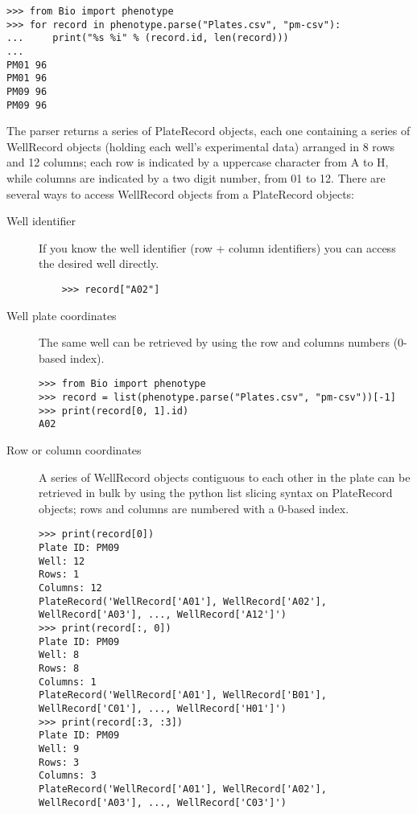 \begin{verbatim}
>>> from Bio import phenotype
>>> for record in phenotype.parse("Plates.csv", "pm-csv"):
...     print("%s %i" % (record.id, len(record)))
...
PM01 96
PM01 96
PM09 96
PM09 96
\end{verbatim}

The parser returns a series of PlateRecord objects, each one containing a series of WellRecord objects
(holding each well's experimental data) arranged in 8 rows and 12 columns; each row is indicated by
a uppercase character from A to H, while columns are indicated by a two digit number, from 01 to 12.
There are several ways to access WellRecord objects from a PlateRecord objects:

\begin{description}
  \item[Well identifier]
    If you know the well identifier (row + column identifiers) you can access the desired well directly.
\begin{verbatim}
    >>> record["A02"]
    \end{verbatim}

  \item[Well plate coordinates]
    The same well can be retrieved by using the row and columns numbers (0-based index).

\begin{verbatim}
>>> from Bio import phenotype
>>> record = list(phenotype.parse("Plates.csv", "pm-csv"))[-1]
>>> print(record[0, 1].id)
A02
\end{verbatim}

  \item[Row or column coordinates]
    A series of WellRecord objects contiguous to each other in the plate can be retrieved in bulk by
    using the python list slicing syntax on PlateRecord objects; rows and columns are numbered with
    a 0-based index.

\begin{verbatim}
>>> print(record[0])
Plate ID: PM09
Well: 12
Rows: 1
Columns: 12
PlateRecord('WellRecord['A01'], WellRecord['A02'], WellRecord['A03'], ..., WellRecord['A12']')
>>> print(record[:, 0])
Plate ID: PM09
Well: 8
Rows: 8
Columns: 1
PlateRecord('WellRecord['A01'], WellRecord['B01'], WellRecord['C01'], ..., WellRecord['H01']')
>>> print(record[:3, :3])
Plate ID: PM09
Well: 9
Rows: 3
Columns: 3
PlateRecord('WellRecord['A01'], WellRecord['A02'], WellRecord['A03'], ..., WellRecord['C03']')
\end{verbatim}

\end{description}

